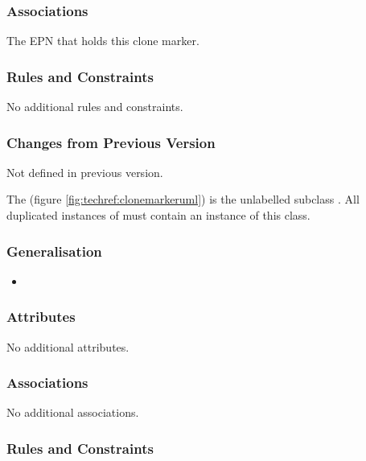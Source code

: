 \subsubsection{Associations}

\begin{attributes}
 The EPN that holds this
clone marker.
\end{attributes}

\subsubsection{Rules and Constraints}

No additional rules and constraints.

\subsubsection{Changes from Previous Version}

Not defined in previous version.


The  (figure \ref{fig:techref:clonemarkeruml}) is
the unlabelled subclass . All duplicated
instances of  must contain an instance of this
class.

\subsubsection{Generalisation}

\begin{itemize}
\item {}
\end{itemize}

\subsubsection{Attributes}

No additional attributes.

\subsubsection{Associations}

No additional associations.

\subsubsection{Rules and Constraints}

